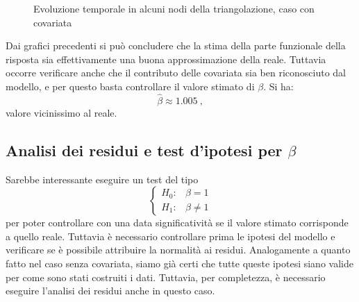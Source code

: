 \documentclass[a4paper,11pt,twoside,openright]{book}							%
\begin{document}
\begin{figure}[t]
	\centering
	\caption{Evoluzione temporale in alcuni nodi della triangolazione, caso con covariata}
	\label{fig:DomCcovar_ris2}
\end{figure}

Dai grafici precedenti si può concludere che la stima della parte funzionale della risposta sia effettivamente una buona approssimazione della reale. Tuttavia occorre verificare anche che il contributo delle covariata sia ben riconosciuto dal modello, e per questo basta controllare il valore stimato di $\beta$. Si ha:
$$
\hat{\beta} \approx 1.005 \ ,
$$
valore vicinissimo al reale.

\subsection{Analisi dei residui e test d'ipotesi per $\beta$}
Sarebbe interessante eseguire un test del tipo
$$
\begin{cases}
H_0: & \beta=1 \\
H_1: & \beta \not = 1
\end{cases}
$$
per poter controllare con una data significatività se il valore stimato corrisponde a quello reale. Tuttavia è necessario controllare prima le ipotesi del modello e verificare se è possibile attribuire la normalità ai residui. Analogamente a quanto fatto nel caso senza covariata, siamo già certi che tutte queste ipotesi siano valide per come sono stati costruiti i dati. Tuttavia, per completezza, è necessario eseguire l'analisi dei residui anche in questo caso.
\end{document}
